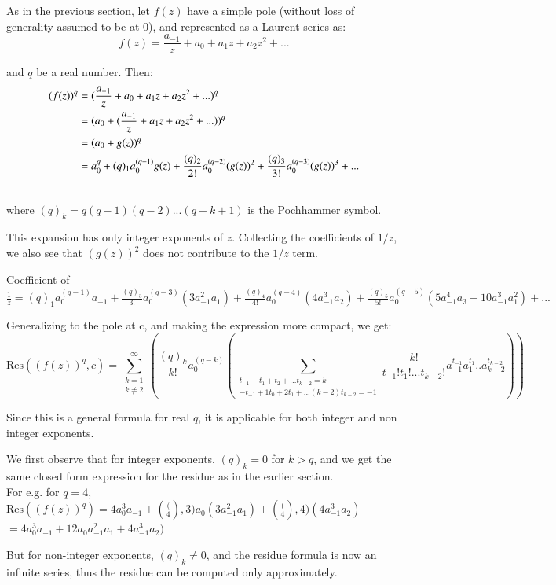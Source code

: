 \documentclass[a4paper,11pt,twoside]{amsart}
\newcommand\Res{\mathrm{Res}}
\begin{document}
As in the previous section, let $f(z)$ have a simple pole (without loss of generality assumed to be at 0), and represented as a Laurent series as:
$$f(z) = \frac{a_{-1}}{z} + a_0 + a_1 z + a_2 z^2 + ...$$

and $q$ be a real number. Then:
\begin{align}
(f(z))^q &= (\frac{a_{-1}}{z} + a_0 + a_1 z + a_2 z^2 + ...)^q \notag\\
&= (a_0 + (\frac{a_{-1}}{z} + a_1 z + a_2 z^2 + ...))^q\notag\\
&= (a_0 + g(z))^q\notag\\
&= a_{0}^q + (q)_{1} a_{0}^{(q-1)} g(z) + \frac{(q)_{2}}{2!} a_{0}^{(q-2)} (g(z))^2 + \frac{(q)_{3}}{3!} a_{0}^{(q-3)} (g(z))^3 + ...\notag\\
\notag
\end{align}
where $(q)_k = q(q-1)(q-2)...(q-k+1)$ is the Pochhammer symbol.

This expansion has only integer exponents of $z$. Collecting the coefficients of $1/z$, we also see that $(g(z))^2$ does not contribute to the $1/z$ term.

Coefficient of $\frac{1}{z} = (q)_{1} a_{0}^{(q-1)} a_{-1} + \frac{(q)_{3}}{3!} a_{0}^{(q-3)} (3 a_{-1}^2 a_1) + \frac{(q)_{4}}{4!} a_{0}^{(q-4)} (4 a_{-1}^3 a_2) + \frac{(q)_{5}}{5!} a_{0}^{(q-5)} (5 a_{-1}^4 a_3 + 10 a_{-1}^3 a_{1}^2) + ...$

Generalizing to the pole at c, and making the expression more compact, we get: 
$$\Res((f(z))^q,c) = \sum\limits_{\substack{k=1 \\ k \ne 2}}^{\infty} (\frac{(q)_{k}}{k!} a_{0}^{(q-k)} (\sum\limits_{\substack{t_{-1} + t_1 + t_2 + ... t_{k-2} = k \\ -t_{-1} + 1t_0 + 2t_1 + ... (k-2)t_{k-2} = -1}} \frac{k!}{t_{-1}!t_{1}!...t_{k-2}!} a_{-1}^{t_{-1}} a_{1}^{t_1}..a_{k-2}^{t_{k-2}}))$$

Since this is a general formula for real $q$, it is applicable for both integer and non integer exponents.

We first observe that for integer exponents, $(q)_k = 0$ for $k>q$, and we get the same closed form expression for the residue as in the earlier section.\\
For e.g. for $q=4$, $\Res((f(z))^q) = 4 a_{0}^3 a_{-1} + \binom(4,3) a_0 (3 a_{-1}^2 a_1) + \binom(4,4) (4 a_{-1}^3 a_2)$
$=4 a_{0}^3 a_{-1} + 12 a_0 a_{-1}^2 a_1 + 4 a_{-1}^3 a_2)$

But for non-integer exponents, $(q)_k \ne 0$, and the residue formula is now an infinite series, thus the residue can be computed only approximately.
\end{document}
